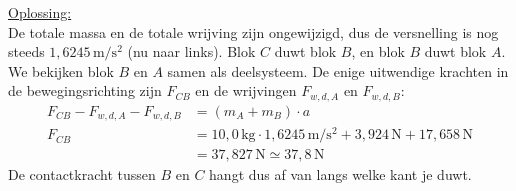 \documentclass{ximera}
\begin{document}
\begin{exercise}
\begin{question}
\begin{solution}
            \underline{Oplossing:}\\
            De totale massa en de totale wrijving zijn ongewijzigd, dus de versnelling is nog steeds $1{,}6245 \, \mathrm{m/s^2}$ (nu naar links). Blok $C$ duwt blok $B$, en blok $B$ duwt blok $A$. We bekijken blok $B$ en $A$ samen als deelsysteem. De enige uitwendige krachten in de bewegingsrichting zijn $F_{CB}$ en de wrijvingen $F_{w,d,A}$ en $F_{w,d,B}$:
            \begin{align*}
                F_{CB} - F_{w,d,A} - F_{w,d,B} &= (m_{A}+m_{B}) \cdot a \\
                F_{CB} &= 10{,}0 \, \mathrm{kg} \cdot 1{,}6245 \, \mathrm{m/s^2} + 3{,}924 \, \mathrm{N} + 17{,}658 \, \mathrm{N} \\
                &= 37{,}827 \, \mathrm{N} \simeq 37{,}8 \, \mathrm{N}
            \end{align*}
            De contactkracht tussen $B$ en $C$ hangt dus af van langs welke kant je duwt.
        \end{solution}
    \end{question}
\end{exercise}
\end{document}
